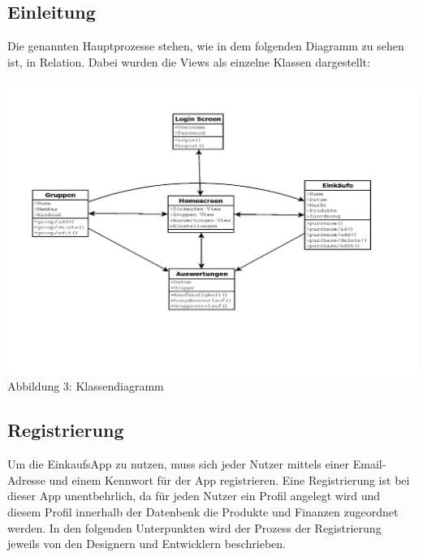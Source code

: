 \documentclass[12pt,a4paper]{article}
\begin{document}
\subsection*{Einleitung}
Die genannten Hauptprozesse stehen, wie in dem folgenden Diagramm zu sehen ist, in Relation. Dabei wurden die Views als einzelne Klassen dargestellt:
\\
\\
\hspace*{-10mm} 
\includegraphics[trim = 17mm 30mm 0mm 20mm,clip,scale=0.7]{Klassendiagramm.pdf}
\\
\footnotesize Abbildung 3: Klassendiagramm
\normalsize

\subsection{Registrierung}
Um die EinkaufsApp zu nutzen, muss sich jeder Nutzer mittels einer Email-Adresse und einem Kennwort für der App registrieren.
Eine Registrierung ist bei dieser App unentbehrlich, da für jeden Nutzer ein Profil angelegt wird und diesem Profil innerhalb der Datenbenk die Produkte und Finanzen zugeordnet werden.
In den folgenden Unterpunkten wird der Prozess der Registrierung jeweils von den Designern und Entwicklern beschrieben.
\end{document}

